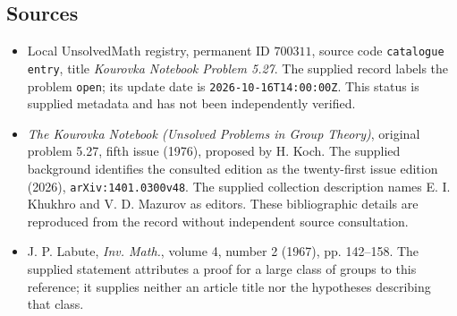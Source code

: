 \documentclass[11pt]{article}
\begin{document}
\subsection{Sources}
\begin{itemize}
\item Local UnsolvedMath registry, permanent ID \(700311\), source code \texttt{catalogue entry}, title \emph{Kourovka Notebook Problem 5.27}. The supplied record labels the problem \texttt{open}; its update date is \texttt{2026-10-16T14:00:00Z}. This status is supplied metadata and has not been independently verified.
\item \emph{The Kourovka Notebook (Unsolved Problems in Group Theory)}, original problem 5.27, fifth issue (1976), proposed by H. Koch. The supplied background identifies the consulted edition as the twenty-first issue edition (2026), \texttt{arXiv:1401.0300v48}. The supplied collection description names E. I. Khukhro and V. D. Mazurov as editors. These bibliographic details are reproduced from the record without independent source consultation.
\item J. P. Labute, \emph{Inv. Math.}, volume 4, number 2 (1967), pp. 142--158. The supplied statement attributes a proof for a large class of groups to this reference; it supplies neither an article title nor the hypotheses describing that class.
\end{itemize}
\end{document}
